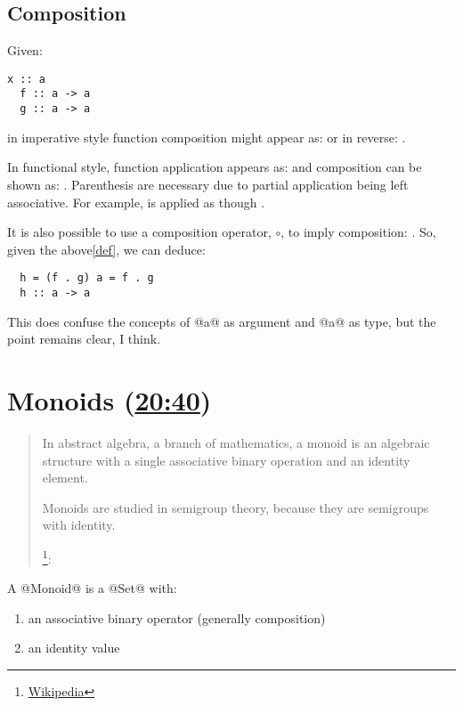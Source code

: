 \subsection{Composition}

Given:
\begin{lstlisting}[frame=trBL, frameround=fttt, framerule=1pt, label=def]
  x :: a
  f :: a -> a
  g :: a -> a
\end{lstlisting}
in imperative style function composition might appear as: 
or in reverse: .

In functional style, function application appears as:  and
composition can be shown as: .  Parenthesis are necessary due to
partial application being left associative.  For example,  is
applied as though .

It is also possible to use a composition operator, $\circ$, to imply composition: .  So, given the above\ref{def}, we can deduce:
\begin{lstlisting}
  h = (f . g) a = f . g
  h :: a -> a
\end{lstlisting}
This does confuse the concepts of @a@ as argument and @a@ as type, but the
point remains clear, I think.


\section{Monoids (\href{https://youtu.be/ZhuHCtR3xq8?t=7m50s}{20:40})}

\begin{minipage}{\linewidth}
  \begin{quotation}
    In abstract algebra, a branch of mathematics, a monoid is an algebraic
    structure with a single associative binary operation and an identity
    element.

    Monoids are studied in semigroup theory, because they are semigroups with
    identity.

    \footnote{\href{https://en.wikipedia.org/wiki/Monoid}{Wikipedia}}:
  \end{quotation}
\end{minipage}


A @Monoid@ is a @Set@ with:
\begin{enumerate}
\item an associative binary operator (generally composition)
\item an identity value
\end{enumerate}

